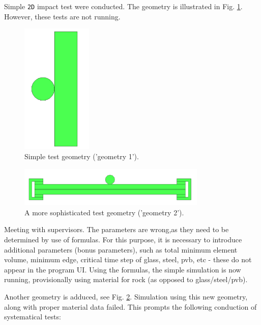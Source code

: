 \par {\color{blue}\textbf{}}
Simple \texttt{2D} impact test were conducted. The geometry is illustrated in Fig. \ref{fig:initgeom}. However, these tests are not running.

\begin{figure}
	\centering
	\includegraphics[width=0.3\textwidth]{initial_geometry.PNG}
	\caption{Simple test geometry ('geometry 1').}
	\label{fig:initgeom}
\end{figure}

\begin{figure}[!h]
	\centering
	\includegraphics[width=0.8\textwidth]{geometry2.PNG}
	\caption{A more sophisticated test geometry ('geometry 2').}
	\label{fig:geometry2}
\end{figure}

\bigbreak
{}
Meeting with supervisors. The parameters are wrong,as they need to be determined by use of formulas. For this purpose, it is necessary to introduce additional parameters (bonus parameters), such as total minimum element volume, minimum edge, critical time step of glass, steel, pvb, etc - these do not appear in the program UI. Using the formulas, the simple simulation is now running, provisionally using material for rock (as opposed to glass/steel/pvb).

\bigbreak
{}
Another geometry is adduced, see Fig. \ref{fig:geometry2}. Simulation using this new geometry, along with proper material data failed. This prompts the following conduction of systematical tests:


